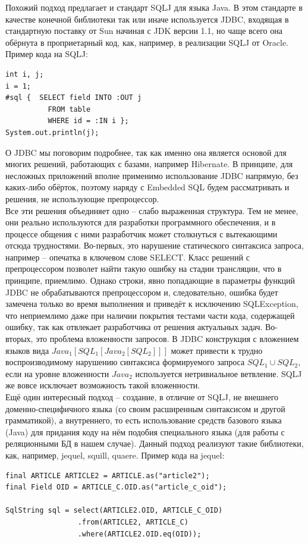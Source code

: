 \documentclass[12pt]{article}
\begin{document}
Похожий подход предлагает и стандарт SQLJ для языка Java. В этом стандарте в качестве конечной библиотеки так или иначе используется JDBC, входящая в стандартную поставку от Sun начиная с JDK версии 1.1, но чаще всего она обёрнута в проприетарный код, как, например, в реализации SQLJ от Oracle. Пример кода на SQLJ:
\begin{lstlisting}
int i, j;
i = 1;
#sql {	SELECT field INTO :OUT j
          FROM table
          WHERE id = :IN i };
System.out.println(j);
\end{lstlisting}
О JDBC мы поговорим подробнее, так как именно она является основой для многих решений, работающих с базами, например Hibernate. В принципе, для несложных приложений вполне применимо использование JDBC напрямую, без каких-либо обёрток, поэтому наряду с Embedded SQL будем рассматривать и решения, не использующие препроцессор.\\

Все эти решения объединяет одно -- слабо выраженная структура. Тем не менее, они реально используются для разработки программного обеспечения, и в процессе общения с ними разработчик может столкнуться с вытекающими отсюда трудностями. Во-первых, это нарушение статического синтаксиса запроса, например -- опечатка в ключевом слове SELECT. Класс решений с препроцессором позволет найти такую ошибку на стадии трансляции, что в принципе, приемлимо. Однако строки, явно попадающие в параметры функций JDBC не обрабатываются препроцессором и, следовательно, ошибка будет замечена только во время выполнения и приведёт к исключению SQLException, что неприемлимо даже при наличии покрытия тестами части кода, содержащей ошибку, так как отвлекает разработчика от решения актуальных задач. Во-вторых, это проблема вложенности запросов. В JDBC конструкция с вложением языков вида $Java_1[SQL_1[Java_2[SQL_2]]]$ может привести к трудно воспроизводимому нарушению синтаксиса формируемого запроса $SQL_1 \cup SQL_2$, если на уровне вложенности $Java_2$ используется нетривиальное ветвление. SQLJ же вовсе исключает возможность такой вложенности.\\

Ещё один интересный подход -- создание, в отличие от SQLJ, не внешнего доменно-специфичного языка (со своим расширенным синтаксисом и другой грамматикой), а внутреннего, то есть использование средств базового языка (Java) для придания коду на нём подобия специального языка (для работы с реляционными БД в нашем случае). Данный подход реализуют такие библиотеки, как, например, jequel, squill, quaere. Пример кода на jequel:
\begin{lstlisting}
final ARTICLE ARTICLE2 = ARTICLE.as("article2");
final Field OID = ARTICLE_C.OID.as("article_c_oid");

SqlString sql = select(ARTICLE2.OID, ARTICLE_C_OID)
                 .from(ARTICLE2, ARTICLE_C)
                 .where(ARTICLE2.OID.eq(OID));
\end{lstlisting}
\end{document}
